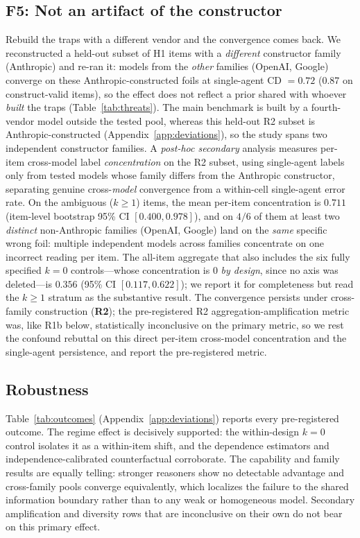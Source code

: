 \documentclass[acmsmall,screen,review,anonymous]{acmart}
\newcommand{\cd}{\textsf{CD}}
\begin{document}
\subsection{F5: Not an artifact of the constructor}
Rebuild the traps with a different vendor and the convergence comes back. We reconstructed a held-out subset
of H1 items with a \emph{different} constructor family (Anthropic) and re-ran it: models from the
\emph{other} families (OpenAI, Google) converge on these Anthropic-constructed foils at single-agent \cd{}
$=0.72$ (0.87 on construct-valid items), so the effect does not reflect a prior shared with whoever
\emph{built} the traps (Table~\ref{tab:threats}). The
main benchmark is built by a fourth-vendor model outside the tested pool, whereas this
held-out R2 subset is Anthropic-constructed (Appendix~\ref{app:deviations}), so the study spans two independent constructor
families. A
\emph{post-hoc secondary} analysis measures per-item
cross-model label \emph{concentration} on the R2 subset, using single-agent labels only from tested models
whose family differs from the Anthropic constructor, separating genuine cross-\emph{model} convergence from a
within-cell single-agent error rate. On the ambiguous ($k\ge1$) items, the mean per-item
concentration is $0.711$ (item-level bootstrap 95\% CI $[0.400,0.978]$), and on $4/6$ of them at least two
\emph{distinct} non-Anthropic families (OpenAI, Google) land on the \emph{same} specific wrong foil: multiple
independent models across families concentrate on one incorrect reading per item. The all-item aggregate that
also includes the six fully specified $k{=}0$ controls---whose concentration is $0$ \emph{by design}, since
no axis was deleted---is $0.356$ (95\% CI $[0.117,0.622]$); we report it for completeness but read the
$k\ge1$ stratum as the substantive result. The convergence persists under
cross-family construction (\textbf{R2}); the pre-registered R2 aggregation-amplification metric was, like
R1b below, statistically inconclusive on the primary metric, so we rest the confound rebuttal on this direct
per-item cross-model concentration and the single-agent persistence, and report the pre-registered metric.

\subsection{Robustness}
\label{sec:robust}
Table~\ref{tab:outcomes} (Appendix~\ref{app:deviations}) reports every pre-registered outcome. The regime
effect is decisively supported: the within-design $k{=}0$ control isolates it as a within-item shift, and the
dependence estimators and independence-calibrated counterfactual corroborate. The capability and family
results are equally telling: stronger reasoners show no detectable advantage and cross-family pools converge
equivalently, which localizes the failure to the shared information boundary rather than to any weak or
homogeneous model. Secondary amplification and diversity rows that are inconclusive on their own do not bear
on this primary effect.
\end{document}
